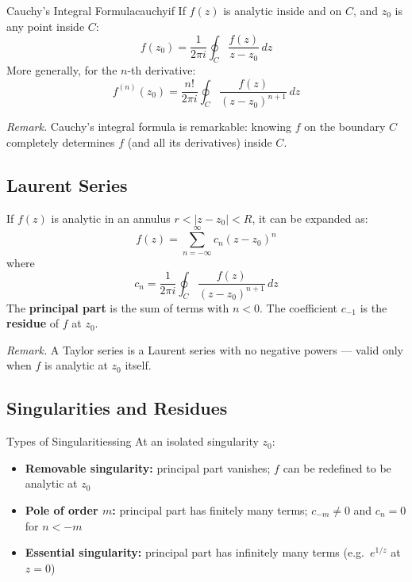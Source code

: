 \documentclass[11pt, letterpaper]{article}
\theoremstyle{plain}
\newenvironment{remark}{\smallskip\noindent\textit{Remark.}}{\smallskip}
\begin{document}
\begin{theorem}{Cauchy's Integral Formula}{cauchyif}
    If $f(z)$ is analytic inside and on $C$, and $z_0$ is any point inside $C$:
    \[
        f(z_0) = \frac{1}{2\pi i}\oint_C \frac{f(z)}{z - z_0}\,dz
    \]
    More generally, for the $n$-th derivative:
    \[
        f^{(n)}(z_0) = \frac{n!}{2\pi i}\oint_C \frac{f(z)}{(z-z_0)^{n+1}}\,dz
    \]
\end{theorem}

\begin{remark}
    Cauchy's integral formula is remarkable: knowing $f$ on the boundary $C$
    completely determines $f$ (and all its derivatives) inside $C$.
\end{remark}


\subsection{Laurent Series}

If $f(z)$ is analytic in an annulus $r < |z - z_0| < R$, it can be expanded as:
\[
    f(z) = \sum_{n=-\infty}^{\infty} c_n (z - z_0)^n
\]
where
\[
    c_n = \frac{1}{2\pi i}\oint_C \frac{f(z)}{(z-z_0)^{n+1}}\,dz
\]
The \textbf{principal part} is the sum of terms with $n < 0$. The coefficient
$c_{-1}$ is the \textbf{residue} of $f$ at $z_0$.

\begin{remark}
    A Taylor series is a Laurent series with no negative powers — valid only
    when $f$ is analytic at $z_0$ itself.
\end{remark}


\subsection{Singularities and Residues}

\begin{definition}{Types of Singularities}{sing}
    At an isolated singularity $z_0$:
    \begin{itemize}
        \item \textbf{Removable singularity:} principal part vanishes;
              $f$ can be redefined to be analytic at $z_0$
        \item \textbf{Pole of order $m$:} principal part has finitely many
              terms; $c_{-m} \neq 0$ and $c_n = 0$ for $n < -m$
        \item \textbf{Essential singularity:} principal part has infinitely
              many terms (e.g.\ $e^{1/z}$ at $z=0$)
    \end{itemize}
\end{definition}
\end{document}

